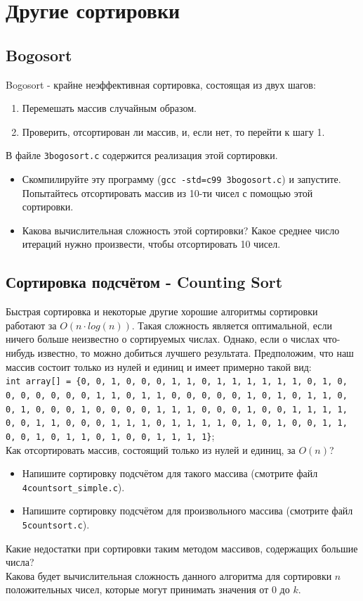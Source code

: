 \documentclass{article}
\begin{document}
\newpage
\section*{Другие сортировки}
\subsection*{Bogosort}
Bogosort - крайне неэффективная сортировка, состоящая из двух шагов:
\begin{enumerate}
\item Перемешать массив случайным образом.
\item Проверить, отсортирован ли массив, и, если нет, то перейти к шагу 1.
\end{enumerate}
В файле \texttt{3bogosort.c} содержится реализация этой сортировки.
\begin{itemize}
\item Скомпилируйте эту программу (\texttt{gcc -std=c99 3bogosort.c}) и запустите. Попытайтесь отсортировать массив из 10-ти чисел с помощью этой сортировки.
\item Какова вычислительная сложность этой сортировки? Какое среднее число итераций нужно произвести, чтобы отсортировать 10 чисел.
\end{itemize}

\subsection*{Сортировка подсчётом - Counting Sort}
Быстрая сортировка и некоторые другие хорошие алгоритмы сортировки работают за $O(n \cdot log(n))$. Такая сложность является оптимальной, если ничего больше неизвестно о сортируемых числах. Однако, если о числах что-нибудь известно, то можно добиться лучшего результата. Предположим, что наш массив состоит только из нулей и единиц и имеет примерно такой вид: \\
\texttt{int array[] = \{0, 0, 1, 0, 0, 0, 1, 1, 0, 1, 1, 1, 1, 1, 1, 0, 1, 0, 0, 0, 0, 0, 0, 0, 1, 1, 0, 1, 1, 0, 0, 0, 0, 0, 1, 0, 1, 0, 1, 1, 0, 0, 1, 0, 0, 0, 1, 0, 0, 0, 0, 1, 1, 1, 0, 0, 0, 1, 0, 0, 1, 1, 1, 1, 0, 0, 1, 1, 0, 0, 0, 1, 1, 1, 0, 1, 1, 1, 1, 0, 1, 0, 1, 0, 0, 1, 1, 0, 0, 1, 0, 1, 1, 0, 1, 0, 0, 1, 1, 1, 1\}};\\
Как отсортировать массив, состоящий только из нулей и единиц, за $O(n)$?\\
\begin{itemize}
\item Напишите сортировку подсчётом для такого массива (смотрите файл \texttt{4countsort\_simple.c}).
\item Напишите сортировку подсчётом для произвольного массива (смотрите файл \texttt{5countsort.c}).
\end{itemize}
Какие недостатки при сортировки таким методом массивов, содержащих большие числа?\\
Какова будет вычислительная сложность данного алгоритма для сортировки $n$ положительных чисел, которые могут принимать значения от $0$ до $k$.
\end{document}
